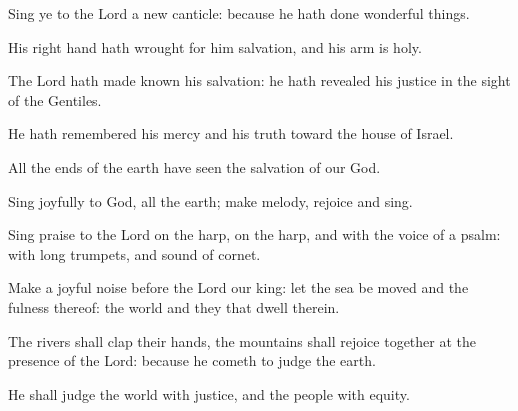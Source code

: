 ﻿\item Sing ye to the Lord a new canticle: because he hath done wonderful things.
\item His right hand hath wrought for him salvation, and his arm is holy.
\item The Lord hath made known his salvation: he hath revealed his justice in the sight of the Gentiles.
\item He hath remembered his mercy and his truth toward the house of Israel.
\item All the ends of the earth have seen the salvation of our God.
\item Sing joyfully to God, all the earth; make melody, rejoice and sing.
\item Sing praise to the Lord on the harp, on the harp, and with the voice of a psalm: with long trumpets, and sound of cornet.
\item Make a joyful noise before the Lord our king: let the sea be moved and the fulness thereof: the world and they that dwell therein.
\item The rivers shall clap their hands, the mountains shall rejoice together at the presence of the Lord: because he cometh to judge the earth.
\item He shall judge the world with justice, and the people with equity.